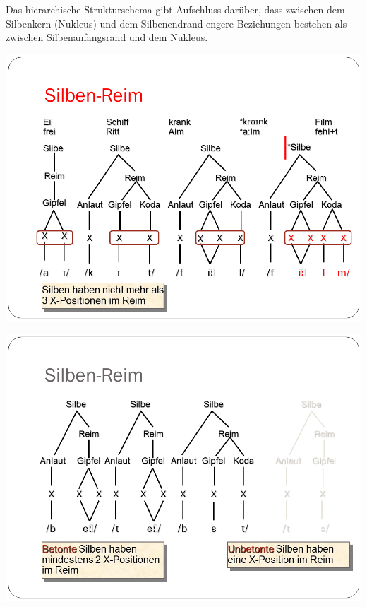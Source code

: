 \documentclass[
  letterpaper,
]{scrbook}
\begin{document}
Das hierarchische Strukturschema gibt Aufschluss darüber, dass zwischen
dem Silbenkern (Nukleus) und dem Silbenendrand engere Beziehungen
bestehen als zwischen Silbenanfangsrand und dem Nukleus.

\includegraphics[width=1\textwidth,height=\textheight]{./pictures/Wagner_Maas_Duden_Petric_20.PNG}

\includegraphics[width=1\textwidth,height=\textheight]{./pictures/Wagner_Maas_Duden_Petric_21.PNG}
\end{document}
